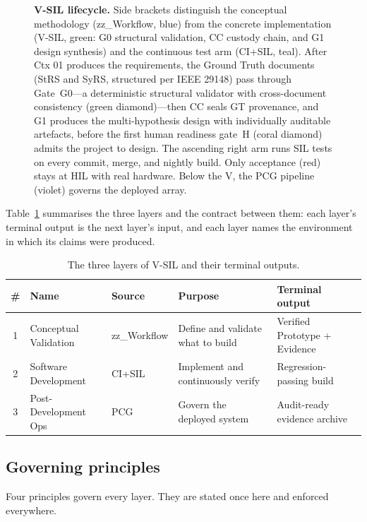 \documentclass[11pt,a4paper]{article}
\begin{document}
\begin{figure}[htbp]
{\begin{tikzpicture}
\end{tikzpicture}}%
\caption{\textbf{V-SIL lifecycle.} Side brackets distinguish the conceptual methodology
(zz\_Workflow, blue) from the concrete implementation (V-SIL, green: G0 structural validation,
CC custody chain, and G1 design synthesis) and the continuous test
arm (CI+SIL, teal). After Ctx 01 produces the requirements, the Ground Truth documents (StRS
and SyRS, structured per IEEE 29148) pass through Gate~G0---a deterministic structural
validator with cross-document consistency (green diamond)---then CC seals GT provenance,
and G1 produces the multi-hypothesis design with individually auditable artefacts,
before the first human readiness gate~H (coral diamond) admits
the project to design. The ascending right arm runs SIL tests on every commit, merge, and
nightly build. Only acceptance (red) stays at HIL with real hardware. Below the V, the PCG
pipeline (violet) governs the deployed array.}
\label{fig:vsil}
\end{figure}

Table~\ref{tab:layers} summarises the three layers and the contract between them: each layer's
terminal output is the next layer's input, and each layer names the environment in which its
claims were produced.

\begin{table}[htbp]
\centering
\caption{The three layers of V-SIL and their terminal outputs.}
\label{tab:layers}
\small
\begin{tabular}{@{}clllp{4.2cm}@{}}
\toprule
\textbf{\#} & \textbf{Name} & \textbf{Source} & \textbf{Purpose} & \textbf{Terminal output} \\
\midrule
1 & Conceptual Validation & zz\_Workflow & Define and validate what to build & Verified Prototype + Evidence \\
2 & Software Development & CI+SIL & Implement and continuously verify & Regression-passing build \\
3 & Post-Development Ops & PCG & Govern the deployed system & Audit-ready evidence archive \\
\bottomrule
\end{tabular}
\end{table}

\subsection{Governing principles}
\label{sec:principles}

Four principles govern every layer. They are stated once here and enforced everywhere.
\end{document}
